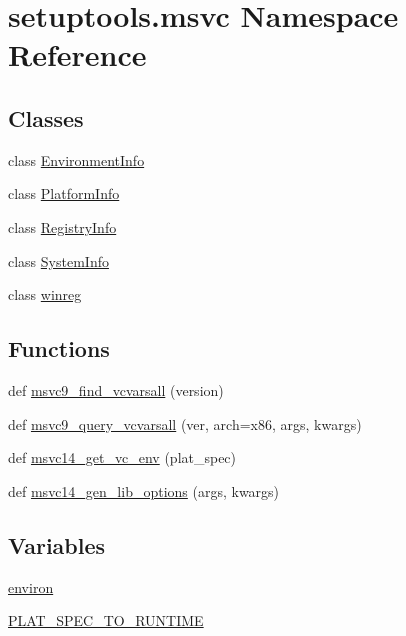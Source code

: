 \hypertarget{namespacesetuptools_1_1msvc}{}\section{setuptools.\+msvc Namespace Reference}
\label{namespacesetuptools_1_1msvc}
\subsection*{Classes}
\begin{DoxyCompactItemize}
\item 
class \hyperlink{classsetuptools_1_1msvc_1_1EnvironmentInfo}{Environment\+Info}
\item 
class \hyperlink{classsetuptools_1_1msvc_1_1PlatformInfo}{Platform\+Info}
\item 
class \hyperlink{classsetuptools_1_1msvc_1_1RegistryInfo}{Registry\+Info}
\item 
class \hyperlink{classsetuptools_1_1msvc_1_1SystemInfo}{System\+Info}
\item 
class \hyperlink{classsetuptools_1_1msvc_1_1winreg}{winreg}
\end{DoxyCompactItemize}
\subsection*{Functions}
\begin{DoxyCompactItemize}
\item 
def \hyperlink{namespacesetuptools_1_1msvc_a4ee903451bc75bf16dbdd14461ed230f}{msvc9\+\_\+find\+\_\+vcvarsall} (version)
\item 
def \hyperlink{namespacesetuptools_1_1msvc_afdbaf4f7d94d7e19c621a4632d9a8027}{msvc9\+\_\+query\+\_\+vcvarsall} (ver, arch=\textquotesingle{}x86\textquotesingle{}, args, kwargs)
\item 
def \hyperlink{namespacesetuptools_1_1msvc_abf4312c4a50e38b0965b836584cf402c}{msvc14\+\_\+get\+\_\+vc\+\_\+env} (plat\+\_\+spec)
\item 
def \hyperlink{namespacesetuptools_1_1msvc_aa2d697d927b0bed28a47be76cea5a729}{msvc14\+\_\+gen\+\_\+lib\+\_\+options} (args, kwargs)
\end{DoxyCompactItemize}
\subsection*{Variables}
\begin{DoxyCompactItemize}
\item 
\hyperlink{namespacesetuptools_1_1msvc_a8bd7d4dc579a6378c5a0eecdd3e297f0}{environ}
\item 
\hyperlink{namespacesetuptools_1_1msvc_a8c44cd3283c29885e2f51a76d5b4fdd9}{P\+L\+A\+T\+\_\+\+S\+P\+E\+C\+\_\+\+T\+O\+\_\+\+R\+U\+N\+T\+I\+ME}
\end{DoxyCompactItemize}


